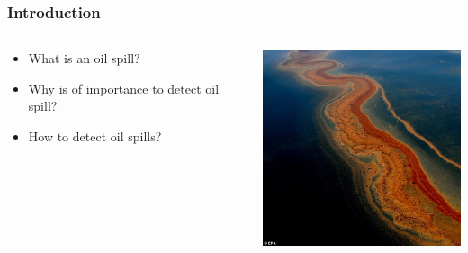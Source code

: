 \documentclass{beamer}
\begin{document}
\begin{frame}
\frametitle{Introduction}
\begin{columns}[T]
    \begin{column}{.5\textwidth}
     
		\begin{itemize}
			\item What is an oil spill?
			\item Why is of importance to detect oil spill? %
			\item How to detect oil spills? %
			
			
		\end{itemize}
   
    \end{column}
    \begin{column}{.5\textwidth}
    
	\includegraphics[width=60mm,scale=1]{./img/mex.jpg}	    
	
    \end{column}
  \end{columns}
\end{frame}
\end{document}
